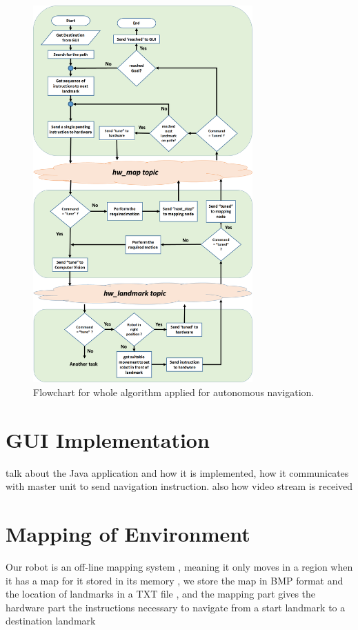 \documentclass[12pt]{article}
\begin{document}
\newpage

\begin{figure}
	\centering
	\includegraphics[width =0.75\textwidth]{Fig/full-algorithm.png}
	\caption{Flowchart for whole algorithm applied for autonomous navigation.}
	\label{fig:full-algorithm}
\end{figure}

\newpage
\clearpage
\newpage

\section{GUI Implementation}
talk about the Java application and how it is implemented, how it communicates with master unit to send navigation instruction. also how video stream is received

\newpage

\section{Mapping of Environment}
Our robot is an off-line mapping system , meaning it only moves in a region when it has a map for it stored in its memory , we store the map in BMP format and the location of landmarks in a TXT file , and the mapping part gives the hardware part the instructions necessary to navigate from a start landmark to a destination landmark
\end{document}
